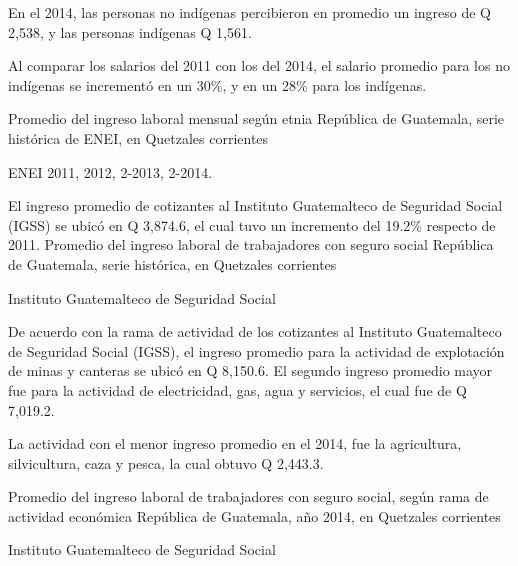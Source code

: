 
%
{%
En el 2014, las personas no indígenas percibieron en promedio un ingreso de Q 2,538, y las personas indígenas Q 1,561. 


Al comparar los salarios del 2011 con los del 2014, el salario promedio para los no indígenas se incrementó en un 30\%, y en un 28\% para los indígenas.}%
{%
	Promedio del ingreso laboral mensual según etnia} %
{%
	República de Guatemala, serie histórica de ENEI, en Quetzales corrientes} %
{%
	\begin{tikzpicture}[x=1pt,y=1pt]    \end{tikzpicture}}%
{%
	ENEI 2011, 2012, 2-2013, 2-2014.} %



%
{%
El ingreso promedio de cotizantes al Instituto Guatemalteco de Seguridad Social (IGSS) se ubicó en Q 3,874.6, el cual tuvo un incremento del 19.2\% respecto de 2011.}%
{%
	Promedio del ingreso laboral de trabajadores con seguro social } %
{%
	República de Guatemala, serie histórica, en Quetzales corrientes} %
{%
	\begin{tikzpicture}[x=1pt,y=1pt]    \end{tikzpicture}}%
{%
	Instituto Guatemalteco de Seguridad Social} %



%
{%
De acuerdo con la rama de actividad de los cotizantes al Instituto Guatemalteco de Seguridad Social (IGSS), el ingreso promedio para la actividad de explotación de minas y canteras se ubicó en Q 8,150.6. El segundo ingreso promedio mayor fue para la actividad de electricidad, gas, agua y servicios, el cual fue de Q 7,019.2.

La actividad con el menor ingreso promedio en el 2014, fue la agricultura, silvicultura, caza y pesca, la cual obtuvo Q 2,443.3.}%
{%
	Promedio del ingreso laboral de trabajadores con seguro social, según rama de actividad económica} %
{%
	República de Guatemala, año 2014, en Quetzales corrientes} %
{%
	\begin{tikzpicture}[x=1pt,y=1pt]    \end{tikzpicture}}%
{%
	Instituto Guatemalteco de Seguridad Social} %

